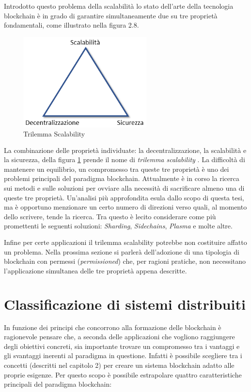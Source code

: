 Introdotto questo problema della scalabilità lo stato dell’arte della tecnologia blockchain è in grado di garantire simultaneamente due su tre proprietà fondamentali, come illustrato nella figura 2.8.

\begin{figure}[H]
\centering
\includegraphics[width=0.6\textwidth]{immagini/trilemmascalab.png}
\caption{Trilemma Scalability}
\label{fig:TrilemmaScalab}
\end{figure}

La combinazione delle proprietà individuate: la decentralizzazione, la scalabilità e la sicurezza, della figura \ref{fig:TrilemmaScalab} prende il nome di \emph{trilemma scalability} . La difficoltà di mantenere un equilibrio, un compromesso tra queste tre proprietà è uno dei problemi principali del paradigma blockchain. Attualmente è in corso la ricerca sui metodi e sulle soluzioni per ovviare alla necessità di sacrificare almeno una di queste tre proprietà. Un’analisi più approfondita esula dallo scopo di questa tesi, ma è opportuno menzionare un certo numero di direzioni verso quali, al momento dello scrivere, tende la ricerca. Tra questo è lecito considerare come più promettenti le seguenti soluzioni: \emph{Sharding}, \emph{Sidechains}, \emph{Plasma} e molte altre.

Infine per certe applicazioni il trilemma scalability potrebbe non costituire affatto un problema. Nella prossima sezione si parlerà dell’adozione di una tipologia di blockchain con permessi (\emph{permissioned}) che, per ragioni pratiche, non necessitano l’applicazione simultanea delle tre proprietà appena descritte.

\section{Classificazione di sistemi distribuiti} %

In funzione dei principi che concorrono alla formazione delle blockchain è ragionevole pensare che, a seconda delle applicazioni che vogliono raggiungere degli obiettivi concreti, sia importante trovare un compromesso tra i vantaggi e gli svantaggi inerenti al paradigma in questione. Infatti è possibile scegliere tra i concetti (descritti nel capitolo 2) per creare un sistema blockchain adatto alle proprie esigenze. Per questo scopo è possibile estrapolare quattro caratteristiche principali del paradigma blockchain:

